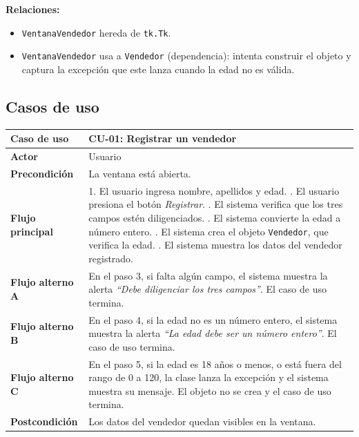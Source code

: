 \documentclass[11pt, a4paper]{article}
\begin{document}
\noindent \textbf{Relaciones:}
\begin{itemize}
    \item \texttt{VentanaVendedor} hereda de \texttt{tk.Tk}.
    \item \texttt{VentanaVendedor} usa a \texttt{Vendedor} (dependencia): intenta construir el objeto y captura la excepción que este lanza cuando la edad no es válida.
\end{itemize}

\subsection{Casos de uso}
\begin{table}[H]
\centering
\begin{tabularx}{\textwidth}{@{}l X@{}}
\toprule
\textbf{Caso de uso} & CU-01: Registrar un vendedor \\
\midrule
\textbf{Actor} & Usuario \\
\textbf{Precondición} & La ventana está abierta. \\
\textbf{Flujo principal} & 1. El usuario ingresa nombre, apellidos y edad. \newline 2. El usuario presiona el botón \textit{Registrar}. \newline 3. El sistema verifica que los tres campos estén diligenciados. \newline 4. El sistema convierte la edad a número entero. \newline 5. El sistema crea el objeto \texttt{Vendedor}, que verifica la edad. \newline 6. El sistema muestra los datos del vendedor registrado. \\
\textbf{Flujo alterno A} & En el paso 3, si falta algún campo, el sistema muestra la alerta \textit{``Debe diligenciar los tres campos''}. El caso de uso termina. \\
\textbf{Flujo alterno B} & En el paso 4, si la edad no es un número entero, el sistema muestra la alerta \textit{``La edad debe ser un número entero''}. El caso de uso termina. \\
\textbf{Flujo alterno C} & En el paso 5, si la edad es 18 años o menos, o está fuera del rango de 0 a 120, la clase lanza la excepción y el sistema muestra su mensaje. El objeto no se crea y el caso de uso termina. \\
\textbf{Postcondición} & Los datos del vendedor quedan visibles en la ventana. \\
\bottomrule
\end{tabularx}
\end{table}
\end{document}
